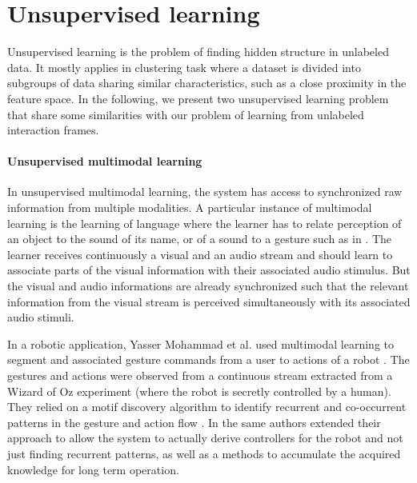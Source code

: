 \section{Unsupervised learning}

Unsupervised learning is the problem of finding hidden structure in unlabeled data. It mostly applies in clustering task where a dataset is divided into subgroups of data sharing similar characteristics, such as a close proximity in the feature space. In the following, we present two unsupervised learning problem that share some similarities with our problem of learning from unlabeled interaction frames.


\paragraph{Unsupervised multimodal learning} In unsupervised multimodal learning, the system has access to synchronized raw information from multiple modalities. A particular instance of multimodal learning is the learning of language where the learner has to relate perception of an object to the sound of its name, or of a sound to a gesture such as in \cite{mangin2013learning}. The learner receives continuously a visual and an audio stream and should learn to associate parts of the visual information with their associated audio stimulus. But the visual and audio informations are already synchronized such that the relevant information from the visual stream is perceived simultaneously with its associated audio stimuli.

In a robotic application, Yasser Mohammad et al. used multimodal learning to segment and associated gesture commands from a user to actions of a robot \cite{mohammad2009unsupervised}. The gestures and actions were observed from a continuous stream extracted from a Wizard of Oz experiment (where the robot is secretly controlled by a human). They relied on a motif discovery algorithm to identify recurrent and co-occurrent patterns in the gesture and action flow \cite{mohammad2009constrained}. In \cite{mohammad2010learning} the same authors extended their approach to allow the system to actually derive controllers for the robot and not just finding recurrent patterns, as well as a methods to accumulate the acquired knowledge for long term operation.

